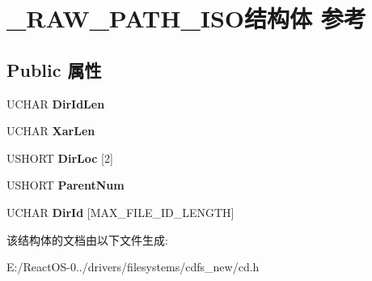\hypertarget{struct___r_a_w___p_a_t_h___i_s_o}{}\section{\+\_\+\+R\+A\+W\+\_\+\+P\+A\+T\+H\+\_\+\+I\+S\+O结构体 参考}
\label{struct___r_a_w___p_a_t_h___i_s_o}
\subsection*{Public 属性}
\begin{DoxyCompactItemize}
\item 
\mbox{\label{struct___r_a_w___p_a_t_h___i_s_o_a5345af6ae0afb39ebe8d261daa38d57d}} 
U\+C\+H\+AR {\bfseries Dir\+Id\+Len}
\item 
\mbox{\label{struct___r_a_w___p_a_t_h___i_s_o_a247eb526f8476af1f7c703bec986da35}} 
U\+C\+H\+AR {\bfseries Xar\+Len}
\item 
\mbox{\label{struct___r_a_w___p_a_t_h___i_s_o_ab4d92997b3168e71ef68c04651ed08c8}} 
U\+S\+H\+O\+RT {\bfseries Dir\+Loc} \mbox{[}2\mbox{]}
\item 
\mbox{\label{struct___r_a_w___p_a_t_h___i_s_o_ad0f6f27f51888a597a699a63c0a8ad3c}} 
U\+S\+H\+O\+RT {\bfseries Parent\+Num}
\item 
\mbox{\label{struct___r_a_w___p_a_t_h___i_s_o_a7ec4ed2438d0b77472dedb8892ee0752}} 
U\+C\+H\+AR {\bfseries Dir\+Id} \mbox{[}M\+A\+X\+\_\+\+F\+I\+L\+E\+\_\+\+I\+D\+\_\+\+L\+E\+N\+G\+TH\mbox{]}
\end{DoxyCompactItemize}


该结构体的文档由以下文件生成\+:\begin{DoxyCompactItemize}
\item 
E\+:/\+React\+O\+S-\/0../drivers/filesystems/cdfs\+\_\+new/cd.\+h\end{DoxyCompactItemize}
